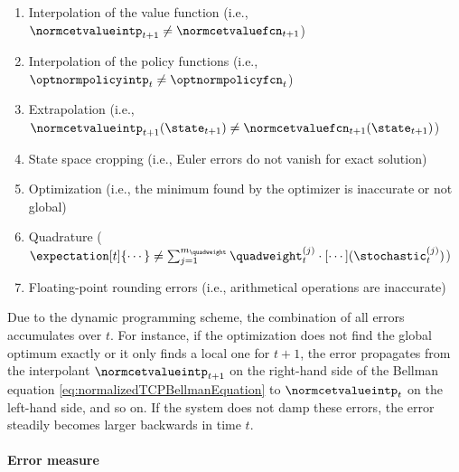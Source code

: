 \begin{enumerate}[
  label=E\arabic*.,
  ref=E\arabic*,
  leftmargin=2.7em,
]
  \item
  \label{item:financeErrorInterpolationValue}
  Interpolation of the value function
  (i.e., $\normcetvalueintp_{t+1} \not= \normcetvaluefcn_{t+1}$)
  
  \item
  \label{item:financeErrorInterpolationPolicy}
  Interpolation of the policy functions
  (i.e., $\optnormpolicyintp_t \not= \optnormpolicyfcn_t$)
  
  \item
  \label{item:financeErrorExtrapolation}
  Extrapolation
  (i.e., $
  \normcetvalueintp_{t+1}(\state_{t+1})
  \not= \normcetvaluefcn_{t+1}(\state_{t+1})
  $)
  
  \item
  \label{item:financeErrorCropping}
  State space cropping
  (i.e., Euler errors do not vanish for exact solution)
  
  \item
  \label{item:financeErrorOptimization}
  Optimization
  (i.e., the minimum found by the optimizer is inaccurate or not global)
  
  \item
  \label{item:financeErrorQuadrature}
  Quadrature
  ($
    \expectation[t]{\cdots}
    \not= \sum_{j=1}^{m_{\quadweight}} \quadweight_t^{(j)}
    \cdot [\cdots](\stochastic_t^{(j)})
  $)
  
  \item
  \label{item:financeErrorRounding}
  Floating-point rounding errors
  (i.e., arithmetical operations are inaccurate)
\end{enumerate}
Due to the dynamic programming scheme,
the combination of all errors accumulates over $t$.
For instance, if the optimization does not find the global optimum
exactly or it only finds a local one for $t + 1$,
the error propagates from the interpolant $\normcetvalueintp_{t+1}$
on the right-hand side of the Bellman equation
\eqref{eq:normalizedTCPBellmanEquation} to $\normcetvalueintp_t$
on the left-hand side, and so on.
If the system does not damp these errors,
the error steadily becomes larger backwards in time $t$.

\paragraph{Error measure}

